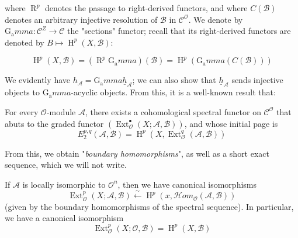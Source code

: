 where $\operatorname{R}^p$ denotes the passage to right-derived functors, and where $C(\mathcal{B})$ denotes an arbitrary injective resolution of $\mathcal{B}$ in $\mathcal{C}^\mathcal{O}$.
We denote by $\operatorname{G_a}mma\colon\mathcal{C}^Z\to\mathcal{C}$ the "sections" functor;
recall that its right-derived functors are denoted by $B\mapsto\operatorname{H}^p(X,\mathcal{B})$:

\begin{equation}\tag{1.3}\label{fga1-equation-1.3}
    \operatorname{H}^p(X,\mathcal{B}) = (\operatorname{R}^p\operatorname{G_a}mma)(\mathcal{B}) = \operatorname{H}^p(\operatorname{G_a}mma(C(\mathcal{B})))
\end{equation}

We evidently have $h_\mathcal{A}=\operatorname{G_a}mma\underline{h}_\mathcal{A}$;
we can also show that $\underline{h}_\mathcal{A}$ sends injective objects to $\operatorname{G_a}mma$-acyclic objects.
From this, it is a well-known result that:

\begin{proposition}\label{fga1-proposition-1}
    For every $\mathcal{O}$-module $\mathcal{A}$, there exists a cohomological spectral functor on $\mathcal{C}^\mathcal{O}$ that abuts to the graded functor $(\operatorname{Ext}_\mathcal{O}^\bullet(X;\mathcal{A},\mathcal{B}))$, and whose initial page is
    \begin{equation}\tag{1.4}\label{fga1-equation-1.4}
        E_2^{p,q}(\mathcal{A},\mathcal{B})= \operatorname{H}^p(X,\operatorname{Ext}_\mathcal{O}^q(\mathcal{A},\mathcal{B}))
    \end{equation}
\end{proposition}

From this, we obtain "\emph{boundary homomorphisms}", as well as a short exact sequence, which we will not write.

\begin{corollary}\label{fga1-proposition-1-corollary-1}
    If $\mathcal{A}$ is locally isomorphic to $\mathcal{O}^n$, then we have canonical isomorphisms
    \begin{equation}\tag{1.5}\label{fga1-equation-1.5}
        \operatorname{Ext}_\mathcal{O}^p(X;\mathcal{A},\mathcal{B}) \xleftarrow{\sim} \operatorname{H}^p(x,\mathcal{H}om_\mathcal{O}(\mathcal{A},\mathcal{B}))
    \end{equation}
    (given by the boundary homomorphisms of the spectral sequence). In particular, we have a canonical isomorphism
    \begin{equation}\tag{1.6}\label{fga1-equation-1.6}
        \operatorname{Ext}_\mathcal{O}^p(X;\mathcal{O},\mathcal{B}) = \operatorname{H}^p(X,\mathcal{B})
    \end{equation}
\end{corollary}


